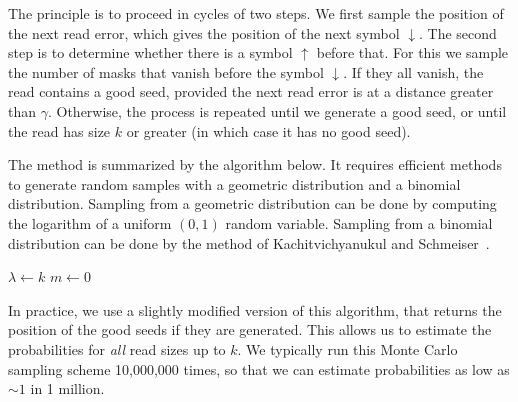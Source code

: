 \documentclass{article}
\begin{document}
The principle is to proceed in cycles of two steps. We first sample the
position of the next read error, which gives the position of the next
symbol $\downarrow$. The second step is to determine whether there is a
symbol $\uparrow$ before that. For this we sample the number of masks that
vanish before the symbol $\downarrow$. If they all vanish, the read
contains a good seed, provided the next read error is at a distance
greater than $\gamma$. Otherwise, the process is repeated until we
generate a good seed, or until the read has size $k$ or greater (in which
case it has no good seed).

The method is summarized by the algorithm below. It requires efficient
methods to generate random samples with a geometric distribution and a
binomial distribution. Sampling from a geometric distribution can be done
by computing the logarithm of a uniform $(0,1)$ random variable. Sampling
from a binomial distribution can be done by the method of
Kachitvichyanukul and Schmeiser~\cite{kachitvichyanukul1988binomial}.

\begin{algorithm}[H]
\label{alg:mcmc}
\SetAlgoLined
{}
  $\lambda \leftarrow k$ 
  $m \leftarrow 0$ 
\end{algorithm}

In practice, we use a slightly modified version of this algorithm, that
returns the position of the good seeds if they are generated. This allows
us to estimate the probabilities for \emph{all} read sizes up to $k$. We
typically run this Monte Carlo sampling scheme 10,000,000 times, so that
we can estimate probabilities as low as $\sim1$ in 1 million.
\end{document}
